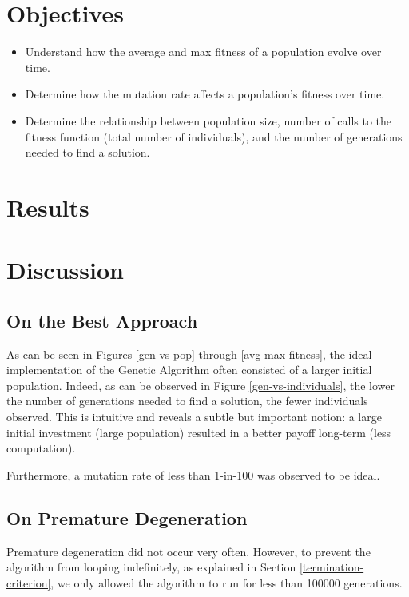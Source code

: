 \documentclass{article}
\begin{document}
\section{Objectives}
  \begin{itemize}
    \renewcommand\labelitemi{$\star$}
    \item{
      Understand how the average and max fitness of a population evolve over
      time.
    }
    \item{
      Determine how the mutation rate affects a population's fitness over time.
    }
    \item{
      Determine the relationship between population size, number of calls to the
      fitness function (total number of individuals), and the number of
      generations needed to find a solution.
    }
  \end{itemize}

\section{Results}
  
  
  
  
  \clearpage
  


\section{Discussion}
  \subsection{On the Best Approach}
    As can be seen in Figures \ref{gen-vs-pop} through \ref{avg-max-fitness},
    the ideal implementation of the Genetic Algorithm often consisted of a
    larger initial population. Indeed, as can be observed in Figure
    \ref{gen-vs-individuals}, the lower the number of generations needed to find
    a solution, the fewer individuals observed. This is intuitive and reveals a
    subtle but important notion: a large initial investment (large population)
    resulted in a better payoff long-term (less computation).

    Furthermore, a mutation rate of less than 1-in-100 was observed to be ideal.

  \subsection{On Premature Degeneration}
    Premature degeneration did not occur very often. However, to prevent the
    algorithm from looping indefinitely, as explained in Section
    \ref{termination-criterion}, we only allowed the algorithm to run for less
    than \num{100000} generations.
\end{document}
